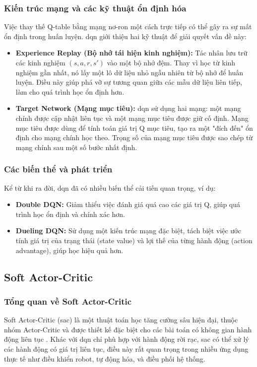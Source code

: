 \subsubsection{Kiến trúc mạng và các kỹ thuật ổn định hóa}
Việc thay thế Q-table bằng mạng nơ-ron một cách trực tiếp có thể gây ra sự mất
ổn định trong huấn luyện. \ac{dqn} giới thiệu hai kỹ thuật để giải quyết
vấn đề này:
\begin{itemize}
    \item \textbf{Experience Replay (Bộ nhớ tái hiện kinh nghiệm):} Tác nhân lưu
        trữ các kinh nghiệm $(s, a, r, s')$ vào một bộ nhớ đệm. Thay vì học từ kinh
        nghiệm gần nhất, nó lấy một lô dữ liệu nhỏ ngẫu nhiên từ bộ nhớ để huấn
        luyện. Điều này giúp phá vỡ sự tương quan giữa các mẫu dữ liệu liên tiếp,
        làm cho quá trình học ổn định hơn.

    \item \textbf{Target Network (Mạng mục tiêu):} \ac{dqn} sử dụng hai mạng:
        một mạng chính được cập nhật liên tục và một mạng mục tiêu được giữ cố
        định. Mạng mục tiêu được dùng để tính toán giá trị Q mục tiêu, tạo ra
        một "đích đến" ổn định cho mạng chính học theo. Trọng số của mạng mục tiêu
        được sao chép từ mạng chính sau một số bước nhất định.
\end{itemize}

\subsubsection{Các biến thể và phát triển}
Kể từ khi ra đời, \ac{dqn} đã có nhiều biến thể cải tiến quan trọng, ví dụ:
\begin{itemize}
    \item \textbf{Double DQN:} Giảm thiểu việc đánh giá quá cao các giá trị Q, giúp
        quá trình học ổn định và chính xác hơn.

    \item \textbf{Dueling DQN:} Sử dụng một kiến trúc mạng đặc biệt, tách biệt việc
        ước tính giá trị của trạng thái (state value) và lợi thế của từng hành động
        (action advantage), giúp học hiệu quả hơn.
\end{itemize}

\subsection{Soft Actor-Critic}
\subsubsection{Tổng quan về Soft Actor-Critic}
Soft Actor-Critic (\ac{sac}) là một thuật toán học tăng cường sâu hiện đại, thuộc nhóm Actor-Critic và được thiết kế đặc biệt cho các bài toán có không gian hành động liên tục \cite{Haarnoja2018}. Khác với \ac{dqn} chỉ phù hợp với hành động rời rạc, \ac{sac} có thể xử lý các hành động có giá trị liên tục, điều này rất quan trọng trong nhiều ứng dụng thực tế như điều khiển robot, tự động hóa, và điều phối hệ thống.

